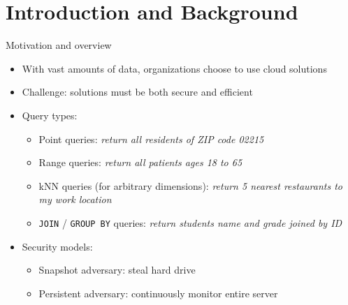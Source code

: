 

\section{Introduction and Background}

	\begin{frame}{Motivation and overview}

		\begin{itemize}
			\item<1-> With vast amounts of data, organizations choose to use cloud solutions
			\item<1-> \alert{Challenge:} solutions must be both secure and efficient
			\item<2-> Query types:
				\begin{itemize}
					\item<1,2,6-> Point queries: \emph{return all residents of ZIP code 02215}
					\item<1,3,6-> Range queries: \emph{return all patients ages 18 to 65}
					\item<1,4,6-> kNN queries (for arbitrary dimensions): \emph{return 5 nearest restaurants to my work location}
					\item<1,5,6-> \texttt{JOIN} / \texttt{GROUP BY} queries: \emph{return students name and grade joined by ID}
				\end{itemize}
			\item<6-> Security models:
				\begin{itemize}
					\item<1-5,6> Snapshot adversary: steal hard drive %
					\item<1-5,7> Persistent adversary: continuously monitor entire server %
				\end{itemize}
		\end{itemize}

	\end{frame}

